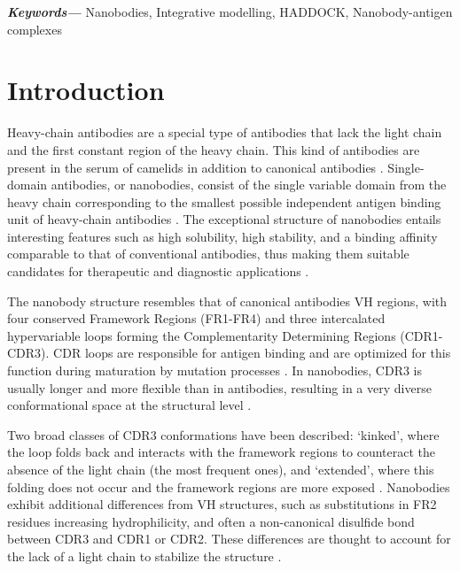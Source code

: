\documentclass[12pt]{article}
\providecommand{\keywords}[1]
{
  \small	
  \textbf{\textit{Keywords---}} #1
}
\begin{document}
\keywords{Nanobodies, Integrative modelling, HADDOCK, Nanobody-antigen complexes}

\section{Introduction}

Heavy-chain antibodies are a special type of antibodies that lack the light chain and the first constant region of the heavy chain. This kind of antibodies are present in the serum of camelids in addition to canonical antibodies \cite{hamers1993naturally}. Single-domain antibodies, or nanobodies, consist of the single variable domain from the heavy chain corresponding to the smallest possible independent antigen binding unit of heavy-chain antibodies \cite{muyldermans2013nanobodies}. The exceptional structure of nanobodies entails interesting features such as high solubility, high stability, and a binding affinity comparable to that of conventional antibodies, thus making them suitable candidates for therapeutic and diagnostic applications \cite{konning2017camelid, gonzalez2017single, liu2021nanobody, vanlandschoot2011nanobodies, bao2021nanobody}.

The nanobody structure resembles that of canonical antibodies VH regions, with four conserved Framework Regions (FR1-FR4) and three intercalated hypervariable loops forming the Complementarity Determining Regions (CDR1-CDR3). CDR loops are responsible for antigen binding and are optimized for this function during maturation by mutation processes \cite{muyldermans2013nanobodies, li2018natural, de2004chemical}. In nanobodies, CDR3 is usually longer and more flexible than in antibodies, resulting in a very diverse conformational space at the structural level \cite{gordon2023comparison}. 

Two broad classes of CDR3 conformations have been described: ‘kinked’, where the loop folds back and interacts with the framework regions to counteract the absence of the light chain (the most frequent ones), and ‘extended’, where this folding does not occur and the framework regions are more exposed \cite{kuroda2022structural, bahrami2023vhh}. Nanobodies exhibit additional differences from VH structures, such as substitutions in FR2 residues increasing hydrophilicity, and often a non-canonical disulfide bond between CDR3 and CDR1 or CDR2. These differences are thought to account for the lack of a light chain to stabilize the structure \cite{conrath2003emergence, li2016comparative, kinoshita2022molecular}.
\end{document}
